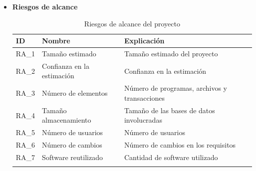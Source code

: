 \begin{enumerate}
\begin{itemize}
\item \textbf{Riesgos de alcance}
\begin{longtable}{l p{5cm} p{9cm}}
\hline
\textbf{ID} & \textbf{Nombre} & \textbf{Explicación} \\
\hline
\endhead
\endfoot
RA\_1 & 
Tamaño estimado &
Tamaño estimado del proyecto
 \\
RA\_2 & 
Confianza en la estimación &
Confianza en la estimación
 \\
RA\_3 & 
Número de elementos &
Número de programas, archivos y transacciones
 \\
RA\_4 & 
Tamaño almacenamiento &
Tamaño de las bases de datos involucradas
 \\
RA\_5 & 
Número de usuarios &
Número de usuarios 
 \\
RA\_6 & 
Número de cambios &
Número de cambios en los requisitos
 \\
RA\_7 & 
Software reutilizado &
Cantidad de software utilizado
 \\
\hline
\caption{Riesgos de alcance del proyecto}\label{ries_alcan}\\
\end{longtable}


\end{itemize}
\end{enumerate}

